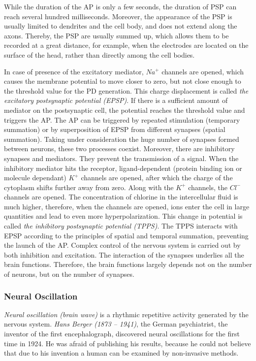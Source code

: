 \documentclass[14pt,a4paper]{scrartcl}
\begin{document}
While the duration of the AP is only a few seconds, the duration of PSP can reach several hundred milliseconds. Moreover, the appearance of the PSP is usually limited to dendrites and the cell body, and does not extend along the axons. Thereby, the PSP are usually summed up, which allows them to be recorded at a great distance, for example, when the electrodes are located on the surface of the head, rather than directly among the cell bodies. 

In case of presence of the excitatory mediator, $Na^{+}$ channels are opened, which causes the membrane potential to move closer to zero, but not close enough to the threshold value for the PD generation. This charge displacement is called \textit{the excitatory postsynaptic potential (EPSP)}. If there is a sufficient amount of mediator on the postsynaptic cell, the potential reaches the threshold value and triggers the AP. The AP can be triggered by repeated stimulation (temporary summation) or by superposition of EPSP from different synapses (spatial summation). Taking under consideration the huge number of synapses formed between neurons, these two processes coexist. Moreover, there are inhibitory synapses and mediators. They prevent the transmission of a signal. When the inhibitory mediator hits the receptor, ligand-dependent (protein binding ion or molecule dependant) $K^{+}$ channels are opened, after which the charge of the cytoplasm shifts further away from zero. Along with the $K^{+}$ channels, the $Cl^{-}$ channels are opened. The concentration of chlorine in the intercellular fluid is much higher, therefore, when the channels are opened, ions enter the cell in large quantities and lead to even more hyperpolarization. This change in potential is called \textit{the inhibitory postsynaptic potential (TPPS)}. The TPPS interacts with EPSP according to the principles of spatial and temporal summation, preventing the launch of the AP. Complex control of the nervous system is carried out by both inhibition and excitation. The interaction of the synapses underlies all the brain functions. Therefore, the brain functions largely depends not on the number of neurons, but on the number of synapses. 

\subsubsection{Neural Oscillation}
\label{sec:Hypothesis:Bioelectricity:Neural Oscillation}

\textit{Neural oscillation (brain wave)} is a rhythmic repetitive activity generated by the nervous system. \textit{Hans Berger (1873 – 1941)}, the German psychiatrist, the inventor of the first encephalograph, discovered neural oscillations for the first time in 1924. He was afraid of publishing his results, because he could not believe that due to his invention a human can be examined by non-invasive methods. 
\end{document}
